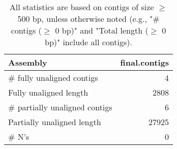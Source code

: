 \documentclass[12pt,a4paper]{article}
\begin{document}
\begin{table}[ht]
\begin{center}
\caption{All statistics are based on contigs of size $\geq$ 500 bp, unless otherwise noted (e.g., "\# contigs ($\geq$ 0 bp)" and "Total length ($\geq$ 0 bp)" include all contigs).}
\begin{tabular}{|l*{1}{|r}|}
\hline
Assembly & final.contigs \\ \hline
\# fully unaligned contigs & 4 \\ \hline
Fully unaligned length & 2808 \\ \hline
\# partially unaligned contigs & 6 \\ \hline
Partially unaligned length & 27925 \\ \hline
\# N's & 0 \\ \hline
\end{tabular}
\end{center}
\end{table}
\end{document}

